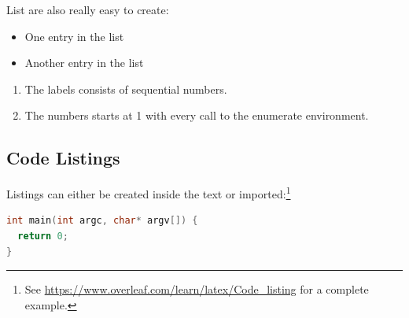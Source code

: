 List are also really easy to create:

\begin{itemize}
  \item One entry in the list
  \item Another entry in the list
\end{itemize}

\begin{enumerate}
  \item The labels consists of sequential numbers.
  \item The numbers starts at 1 with every call to the enumerate environment.
\end{enumerate}

\subsection{Code Listings}
\label{subsec:code}

Listings can either be created inside the text or imported:\footnote{See \url{https://www.overleaf.com/learn/latex/Code_listing} for a complete example.}
\begin{lstlisting}[language=C,label={lst:lstlisting}]
int main(int argc, char* argv[]) {
  return 0;
}
\end{lstlisting}